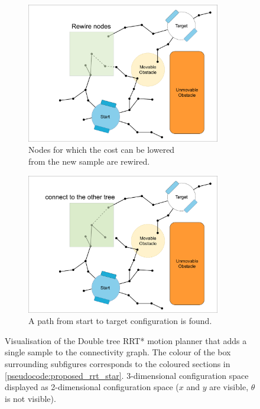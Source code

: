 \begin{figure}[H]
    \begin{subfigure}{.49\textwidth}
    \centering
    \includegraphics[width=0.93\textwidth, cfbox=my_green 5pt 0pt]{figures/mp/5mp_rewire.drawio.png}
    \caption{Nodes for which the cost can be lowered\\from the new sample are rewired.}
    \end{subfigure}
    \begin{subfigure}{.49\textwidth}
    \centering
    \includegraphics[width=0.93\textwidth, cfbox=my_green 5pt 0pt]{figures/mp/6mp_search_other_tree.drawio.png}
    \caption{A path from start to target configuration is found. \bs}
    \end{subfigure}

    \caption{Visualisation of the Double tree \acs{RRT*} motion planner that adds a single sample to the connectivity graph. The colour of the box surrounding subfigures corresponds to the coloured sections in \cref{pseudocode:proposed_rrt_star}. 3-dimensional configuration space displayed as 2-dimensional configuration space ($x$ and $y$ are visible, $\theta$ is not visible).}
    \label{fig:motion_planner_adding_one_sample}
\end{figure}


